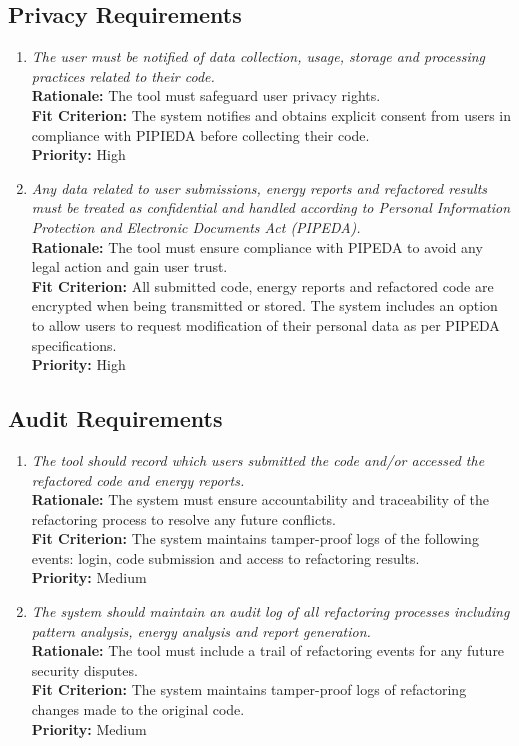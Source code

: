 \documentclass[12pt]{article}
\begin{document}
\subsection{Privacy Requirements}
\begin{enumerate}[label=SR-PR \arabic*., wide=0pt, leftmargin=*]
	\item \emph{The user must be notified of data collection, usage, storage and processing practices related to their code. }\\[2mm]
    {\bf Rationale:} The tool must safeguard user privacy rights.\\
    {\bf Fit Criterion:} The system notifies and obtains explicit consent from users in compliance with PIPIEDA before collecting their code.\\
    {\bf Priority:} High
    \item \emph{Any data related to user submissions, energy reports and refactored results must be treated as confidential and handled according to Personal Information Protection and Electronic Documents Act (PIPEDA).}\\
    {\bf Rationale:} The tool must ensure compliance with PIPEDA to avoid any legal action and gain user trust.\\
    {\bf Fit Criterion:} All submitted code, energy reports and refactored code are encrypted when being transmitted or stored. The system includes an option to allow users to request modification of their personal data as per PIPEDA specifications.\\
    {\bf Priority:} High
\end{enumerate}
\subsection{Audit Requirements}
\begin{enumerate}[label=SR-AUR \arabic*., wide=0pt, leftmargin=*]
    \item \emph{The tool should record which users submitted the code and/or accessed the refactored code and energy reports.}\\[2mm]
    {\bf Rationale:} The system must ensure accountability and traceability of the refactoring process to resolve any future conflicts.\\
    {\bf Fit Criterion:} The system maintains tamper-proof logs of the following events: login, code submission and access to refactoring results.\\[2mm]
    {\bf Priority:} Medium
    \item \emph{The system should maintain an audit log of all refactoring processes including pattern analysis, energy analysis and report generation. }\\
    {\bf Rationale:} The tool must include a trail of refactoring events for any future security disputes.\\
    {\bf Fit Criterion:}  The system maintains tamper-proof logs of refactoring changes made to the original code.\\
    {\bf Priority:} Medium
\end{enumerate}
\end{document}
